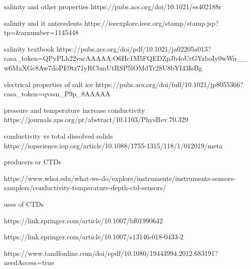 salinity and other properties https://pubs.acs.org/doi/10.1021/es402188r

salinity and it antecedents https://ieeexplore.ieee.org/stamp/stamp.jsp?tp=&arnumber=1145448

salinity textbook https://pubs.acs.org/doi/pdf/10.1021/ja02205a013?casa_token=QPyPLh22vacAAAAA:O6Hc1M5FQEDZpJb4oUrGYzboIy0wWn__w6MxXGc8Aw7doPE9tz71yRCbmUtRSP5lOMdTr28U8bYI43IsBg

electrical properties of salt ice https://pubs.acs.org/doi/full/10.1021/jp8055366?casa_token=qvssn_P9p_8AAAAA%

pressure and temperature increase conductivity https://journals.aps.org/pr/abstract/10.1103/PhysRev.70.329

conductivity vs total dissolved solids https://iopscience.iop.org/article/10.1088/1755-1315/118/1/012019/meta

producers or CTDs

https://www.whoi.edu/what-we-do/explore/instruments/instruments-sensors-samplers/conductivity-temperature-depth-ctd-sensors/

uses of CTDs

https://link.springer.com/article/10.1007/bf01990642

https://link.springer.com/article/10.1007/s13146-018-0433-2

https://www.tandfonline.com/doi/epdf/10.1080/19443994.2012.683191?needAccess=true